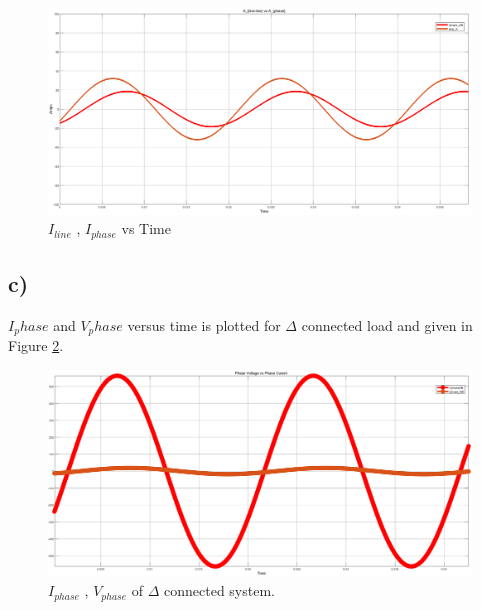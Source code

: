 \documentclass[letterpaper,12pt]{article}
\begin{document}
\begin{figure}[H]
    \centering
    \includegraphics[width = 1\textwidth]{7_3.png}
    \caption{\(I_{line}\) , \(I_{phase}\) vs Time }
    \label{D7b}
\end{figure}
\subsection{c)}
\(I_phase\) and \(V_phase\) versus time is plotted for \(\Delta\) connected load and given in Figure \ref*{D7c}.

\begin{figure}[H]
    \centering
    \includegraphics[width = 1\textwidth]{7_2.png}
    \caption{\(I_{phase}\) , \(V_{phase}\) of \(\Delta\) connected system. }
    \label{D7c}
\end{figure}
\end{document}
